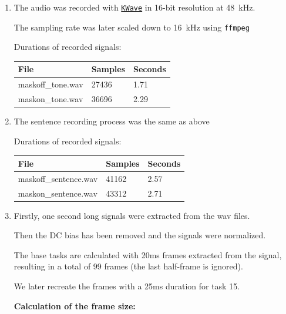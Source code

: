 \documentclass[a4paper, 11pt]{article}
\begin{document}
    \begin{enumerate}
        \item
        The audio was recorded with \texttt{\href{https://apps.kde.org/en/kwave}{KWave}} in 16-bit resolution at 48~kHz.

        The sampling rate was later scaled down to 16~kHz using \texttt{ffmpeg}

        Durations of recorded signals: \\
        \begin{tabular}{ | l | l | l | }
            \hline
            \textbf{File}     & \textbf{Samples} & \textbf{Seconds} \\ \hline
            maskoff\_tone.wav & 27436            & 1.71             \\ \hline
            maskon\_tone.wav  & 36696            & 2.29             \\ \hline
        \end{tabular}

        \item
        The sentence recording process was the same as above

        Durations of recorded signals: \\
        \begin{tabular}{ | l | l | l | }
            \hline
            \textbf{File}         & \textbf{Samples} & \textbf{Seconds} \\ \hline
            maskoff\_sentence.wav & 41162            & 2.57             \\ \hline
            maskon\_sentence.wav  & 43312            & 2.71             \\ \hline
        \end{tabular}

        \newpage
        \item
        Firstly, one second long signals were extracted from the wav files.

        Then the DC bias has been removed and the signals were normalized.

        The base tasks are calculated with 20ms frames extracted from the signal, resulting in a total of 99 frames
        (the last half-frame is ignored).

        We later recreate the frames with a 25ms duration for task 15.

        \vspace{2mm}
        \textbf{Calculation of the frame size:}


\end{enumerate}
\end{document}
